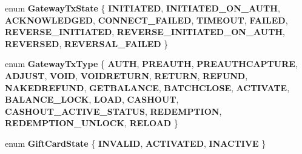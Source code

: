 \begin{DoxyCompactItemize}
enum {\bfseries Gateway\+Tx\+State} \{ \newline
{\bfseries I\+N\+I\+T\+I\+A\+T\+ED}, 
{\bfseries I\+N\+I\+T\+I\+A\+T\+E\+D\+\_\+\+O\+N\+\_\+\+A\+U\+TH}, 
{\bfseries A\+C\+K\+N\+O\+W\+L\+E\+D\+G\+ED}, 
{\bfseries C\+O\+N\+N\+E\+C\+T\+\_\+\+F\+A\+I\+L\+ED}, 
\newline
{\bfseries T\+I\+M\+E\+O\+UT}, 
{\bfseries F\+A\+I\+L\+ED}, 
{\bfseries R\+E\+V\+E\+R\+S\+E\+\_\+\+I\+N\+I\+T\+I\+A\+T\+ED}, 
{\bfseries R\+E\+V\+E\+R\+S\+E\+\_\+\+I\+N\+I\+T\+I\+A\+T\+E\+D\+\_\+\+O\+N\+\_\+\+A\+U\+TH}, 
\newline
{\bfseries R\+E\+V\+E\+R\+S\+ED}, 
{\bfseries R\+E\+V\+E\+R\+S\+A\+L\+\_\+\+F\+A\+I\+L\+ED}
 \}
\item 
\mbox{\label{namespacecom_1_1clover_1_1sdk_1_1v3_1_1payments_a3df1de2debbb23f9584db68737e035e7}} 
enum {\bfseries Gateway\+Tx\+Type} \{ \newline
{\bfseries A\+U\+TH}, 
{\bfseries P\+R\+E\+A\+U\+TH}, 
{\bfseries P\+R\+E\+A\+U\+T\+H\+C\+A\+P\+T\+U\+RE}, 
{\bfseries A\+D\+J\+U\+ST}, 
\newline
{\bfseries V\+O\+ID}, 
{\bfseries V\+O\+I\+D\+R\+E\+T\+U\+RN}, 
{\bfseries R\+E\+T\+U\+RN}, 
{\bfseries R\+E\+F\+U\+ND}, 
\newline
{\bfseries N\+A\+K\+E\+D\+R\+E\+F\+U\+ND}, 
{\bfseries G\+E\+T\+B\+A\+L\+A\+N\+CE}, 
{\bfseries B\+A\+T\+C\+H\+C\+L\+O\+SE}, 
{\bfseries A\+C\+T\+I\+V\+A\+TE}, 
\newline
{\bfseries B\+A\+L\+A\+N\+C\+E\+\_\+\+L\+O\+CK}, 
{\bfseries L\+O\+AD}, 
{\bfseries C\+A\+S\+H\+O\+UT}, 
{\bfseries C\+A\+S\+H\+O\+U\+T\+\_\+\+A\+C\+T\+I\+V\+E\+\_\+\+S\+T\+A\+T\+US}, 
\newline
{\bfseries R\+E\+D\+E\+M\+P\+T\+I\+ON}, 
{\bfseries R\+E\+D\+E\+M\+P\+T\+I\+O\+N\+\_\+\+U\+N\+L\+O\+CK}, 
{\bfseries R\+E\+L\+O\+AD}
 \}
\item 
\mbox{\label{namespacecom_1_1clover_1_1sdk_1_1v3_1_1payments_a67d9d7bce276d6e020d49ff3f322fce3}} 
enum {\bfseries Gift\+Card\+State} \{ {\bfseries I\+N\+V\+A\+L\+ID}, 
{\bfseries A\+C\+T\+I\+V\+A\+T\+ED}, 
{\bfseries I\+N\+A\+C\+T\+I\+VE}
 \}
\item 
\mbox{\label{namespacecom_1_1clover_1_1sdk_1_1v3_1_1payments_ab493172d8abd5947fc0308d7cc311b2d}} 

\end{DoxyCompactItemize}
